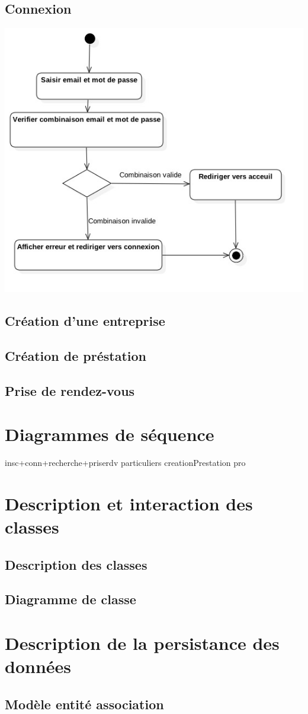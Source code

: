 \documentclass{article}
\begin{document}
\subsection{Connexion}
\begin{center}
  \includegraphics[width=400pt]{diagram/activiteConnexion}
\end{center}
\subsection{Création d'une entreprise}

\subsection{Création de préstation}

\subsection{Prise de rendez-vous}

\section{Diagrammes de séquence}
insc+conn+recherche+priserdv particuliers
creationPrestation pro

\section{Description et interaction des classes}
\subsection{Description des classes}

\subsection{Diagramme de classe}

\section{Description de la persistance des données}
\subsection{Modèle entité association}
\end{document}

